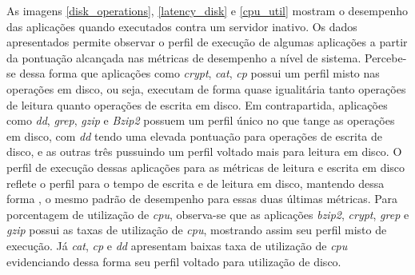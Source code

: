 As imagens \ref{disk_operations}, \ref{latency_disk} e \ref{cpu_util} mostram o desempenho das aplicações quando executados contra um servidor inativo. Os dados apresentados permite observar o perfil de execução de algumas aplicações a partir da pontuação alcançada nas métricas de desempenho a nível de sistema. Percebe-se dessa forma que aplicações como \textit{crypt}, \textit{cat}, \textit{cp} possui um perfil misto nas operações em disco, ou seja, executam de forma quase igualitária tanto operações de leitura quanto operações de escrita em disco. Em contrapartida, aplicações como \textit{dd}, \textit{grep}, \textit{gzip} e \textit{Bzip2} possuem um perfil único no que tange as operações em disco, com \textit{dd} tendo uma elevada pontuação para operações de escrita de disco, e as outras três pussuindo um perfil voltado mais para leitura em disco. O perfil de execução dessas aplicações para as métricas de leitura e escrita em disco reflete o perfil para o tempo de escrita e de leitura em disco, mantendo dessa forma , o mesmo padrão de desempenho para essas duas últimas métricas. Para porcentagem de utilização de \textit{cpu}, observa-se que as aplicações \textit{bzip2}, \textit{crypt}, \textit{grep} e \textit{gzip} possui as taxas de utilização de \textit{cpu}, mostrando assim seu perfil misto de execução. Já \textit{cat}, \textit{cp} e \textit{dd} apresentam baixas taxa de utilização de \textit{cpu} evidenciando dessa forma seu perfil voltado para utilização de disco.

 

  

